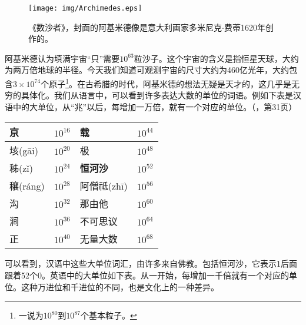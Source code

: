 \documentclass{article}
\begin{document}
\begin{figure}[htbp]
 \centering
 \texttt{[image: img/Archimedes.eps]}
 \captionsetup{labelformat=empty}
 \caption{《数沙者》，封面的阿基米德像是意大利画家多米尼克$\cdot$费蒂1620年创作的。}
 \label{fig:Archimedes}
\end{figure}

阿基米德认为填满宇宙“只”需要$10^{63}$粒沙子。这个宇宙的含义是指恒星天球，大约为两万倍地球的半径。今天我们知道可观测宇宙的尺寸大约为460亿光年，大约包含$3 \times 10^{74}$个原子\footnote{一说为$10^{80}$到$10^{87}$个基本粒子。}。在古希腊的时代，阿基米德的想法无疑是天才的，这几乎是无穷的具体化。我们从语言中，可以看到许多表达大数的单位的词语。例如下表是汉语中的大单位，从“兆”以后，每增加一万倍，就有一个对应的单位。（\cite{Noguchi2007}，第31页）

\begin{center}
\begin{tabular}{|l|r|l|r|}
\hline
京            & $10^{16}$ & 载            & $10^{44}$ \\
\hline
垓(g\={a}i)   & $10^{20}$ & 极            & $10^{48}$ \\
\hline
秭(z\v{i})    & $10^{24}$ & \textbf{恒河沙}  & $10^{52}$ \\
\hline
穰(r\'{a}ng)  & $10^{28}$ & 阿僧祗(zh\={i})  & $10^{56}$ \\
\hline
沟            & $10^{32}$ & 那由他        & $10^{60}$ \\
\hline
涧            & $10^{36}$ & 不可思议      & $10^{64}$ \\
\hline
正            & $10^{40}$ & 无量大数      & $10^{68}$ \\
\hline
\end{tabular}
\end{center}

可以看到，汉语中这些大单位词汇，由许多来自佛教。包括恒河沙，它表示1后面跟着52个0。英语中的大单位如下表。从一开始，每增加一千倍就有一个对应的单位。这种万进位和千进位的不同，也是文化上的一种差异。
\end{document}
